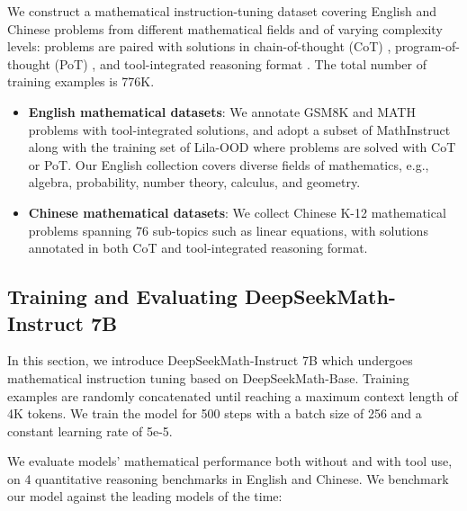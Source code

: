 We construct a mathematical instruction-tuning dataset covering English and Chinese problems from different mathematical fields and of varying complexity levels: problems are paired with solutions in chain-of-thought (CoT) \citep{cot}, program-of-thought (PoT) \citep{pot,pal}, and tool-integrated reasoning format \citep{tora}. The total number of training examples is 776K.

\begin{itemize}[topsep=0pt]
    \item \textbf{English mathematical datasets}: We annotate GSM8K and MATH problems with tool-integrated solutions, and adopt a subset of MathInstruct \citep{MathInstruct} along with the training set of Lila-OOD \citep{lila} where problems are solved with CoT or PoT. Our English collection covers diverse fields of mathematics, e.g., algebra, probability, number theory, calculus, and geometry.
    \item \textbf{Chinese mathematical datasets}: We collect Chinese K-12 mathematical problems spanning 76 sub-topics such as linear equations, with solutions annotated in both CoT and tool-integrated reasoning format.
\end{itemize}

\subsection{Training and Evaluating DeepSeekMath-Instruct 7B}

In this section, we introduce DeepSeekMath-Instruct 7B which undergoes mathematical instruction tuning based on DeepSeekMath-Base. Training examples are randomly concatenated until reaching a maximum context length of 4K tokens. We train the model for 500 steps with a batch size of 256 and a constant learning rate of 5e-5.

We evaluate models' mathematical performance both without and with tool use, on 4 quantitative reasoning benchmarks in English and Chinese. We benchmark our model against the leading models of the time:

